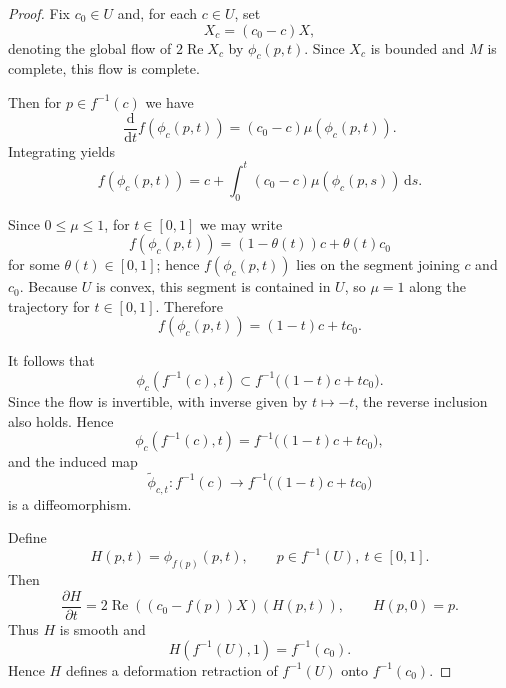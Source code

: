 \documentclass[11pt]{amsart}
\theoremstyle{plain}
\theoremstyle{definition}
\theoremstyle{remark}
\numberwithin{equation}{section}
\begin{document}
\begin{proof}
    Fix $c_0 \in U$ and, for each $c \in U$, set
    \begin{equation}
        X_c = (c_0 - c)X,
    \end{equation}
    denoting the global flow of $2 \operatorname{Re} X_c$ by $\phi_c(p,t)$.
    Since $X_c$ is bounded and $M$ is complete, this flow is complete.

    Then for $p \in f^{-1}(c)$ we have
    \begin{equation}
        \frac{\mathrm{d}}{\mathrm{d}t} f(\phi_c(p,t)) = (c_0 - c)\mu(\phi_c(p,t)).
    \end{equation}
    Integrating yields
    \begin{equation}
        f(\phi_c(p,t)) = c + \int_0^t (c_0 - c)\mu(\phi_c(p,s)) \, \mathrm{d}s.
    \end{equation}

    Since $0 \le \mu \le 1$, for $t \in [0,1]$ we may write
    \begin{equation}
        f(\phi_c(p,t)) = (1 - \theta(t))c + \theta(t)c_0
    \end{equation}
    for some $\theta(t) \in [0,1]$; hence $f(\phi_c(p,t))$ lies on the segment joining $c$ and $c_0$.
    Because $U$ is convex, this segment is contained in $U$, so $\mu = 1$ along the trajectory for $t \in [0,1]$.
    Therefore
    \begin{equation}
        f(\phi_c(p,t)) = (1 - t)c + tc_0.
    \end{equation}

    It follows that
    \begin{equation}
        \phi_c(f^{-1}(c), t) \subset f^{-1}\bigl((1 - t)c + tc_0\bigr).
    \end{equation}
    Since the flow is invertible, with inverse given by $t \mapsto -t$, the reverse inclusion also holds.
    Hence
    \begin{equation}
        \phi_c(f^{-1}(c), t) = f^{-1}\bigl((1 - t)c + tc_0\bigr),
    \end{equation}
    and the induced map
    \begin{equation}
        \tilde{\phi}_{c,t} : f^{-1}(c) \to f^{-1}\bigl((1 - t)c + tc_0\bigr)
    \end{equation}
    is a diffeomorphism.

    Define
    \begin{equation}
        H(p,t) = \phi_{f(p)}(p,t), \qquad p \in f^{-1}(U), \ t \in [0,1].
    \end{equation}
    Then
    \begin{equation}
        \frac{\partial H}{\partial t} = 2\operatorname{Re}((c_0 - f(p))X)(H(p,t)), \qquad H(p,0) = p.
    \end{equation}
    Thus $H$ is smooth and
    \begin{equation}
        H(f^{-1}(U), 1) = f^{-1}(c_0).
    \end{equation}
    Hence $H$ defines a deformation retraction of $f^{-1}(U)$ onto $f^{-1}(c_0)$.


\end{proof}
\end{document}

